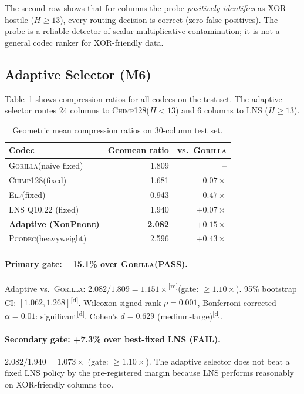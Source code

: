 \documentclass[sigconf]{acmart}
\newcommand{\gorilla}{\textsc{Gorilla}\xspace}
\newcommand{\chimp}{\textsc{Chimp128}\xspace}
\newcommand{\elf}{\textsc{Elf}\xspace}
\newcommand{\pcodec}{\textsc{Pcodec}\xspace}
\newcommand{\system}{\textsc{XorProbe}\xspace}
\newcommand{\measured}{\textsuperscript{[m]}\xspace}
\newcommand{\derived}{\textsuperscript{[d]}\xspace}
\begin{document}
The second row shows that for columns the probe \emph{positively identifies}
as XOR-hostile ($H \geq 13$), every routing decision is correct (zero false
positives).  The probe is a reliable detector of scalar-multiplicative
contamination; it is not a general codec ranker for XOR-friendly data.

\subsection{Adaptive Selector (M6)}

Table~\ref{tab:ratios} shows compression ratios for all codecs on the
test set.  The adaptive selector routes 24 columns to \chimp ($H < 13$)
and 6 columns to LNS ($H \geq 13$).

\begin{table}[h]
\centering
\caption{Geometric mean compression ratios on 30-column test set.}
\label{tab:ratios}
\begin{tabular}{lrr}
\toprule
Codec & Geomean ratio & vs.\ \gorilla \\
\midrule
\gorilla (na\"{i}ve fixed) & 1.809 & -- \\
\chimp (fixed)       & 1.681 & $-0.07\times$ \\
\elf (fixed)         & 0.943 & $-0.47\times$ \\
LNS Q10.22 (fixed)  & 1.940 & $+0.07\times$ \\
\textbf{Adaptive (\system)} & \textbf{2.082} & $+0.15\times$ \\
\pcodec (heavyweight) & 2.596 & $+0.43\times$ \\
\bottomrule
\end{tabular}
\end{table}

\paragraph{Primary gate: +15.1\% over \gorilla (PASS).}
Adaptive vs.\ \gorilla: $2.082 / 1.809 = 1.151\times$\measured (gate: $\geq
1.10\times$).  95\% bootstrap CI: $[1.062, 1.268]$\derived.  Wilcoxon signed-rank
$p = 0.001$, Bonferroni-corrected $\alpha = 0.01$: significant\derived.
Cohen's $d = 0.629$ (medium-large)\derived.

\paragraph{Secondary gate: +7.3\% over best-fixed LNS (FAIL).}
$2.082 / 1.940 = 1.073\times$ (gate: $\geq 1.10\times$).  The adaptive
selector does not beat a fixed LNS policy by the pre-registered margin
because LNS performs reasonably on XOR-friendly columns too.
\end{document}
